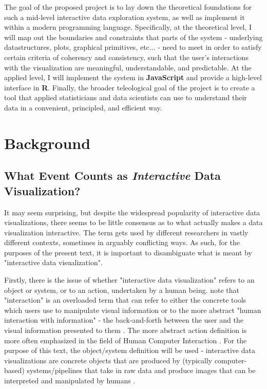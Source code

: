 \documentclass[12pt,a4paper]{article}
\begin{document}
The goal of the proposed project is to lay down the theoretical foundations for such a mid-level interactive data exploration system, as well as implement it within a modern programming language. Specifically, at the theoretical level, I will map out the boundaries and constraints that parts of the system - underlying datastructures, plots, graphical primitives, etc... - need to meet in order to satisfy certain criteria of coherency and consistency, such that the user's interactions with the visualization are meaningful, understandable, and predictable. At the applied level, I will implement the system in \textbf{JavaScript} and provide a high-level interface in \textbf{R}. Finally, the broader teleological goal of the project is to create a tool that applied statisticians and data scientists can use to understand their data in a convenient, principled, and efficient way. 

\section{Background}
\label{sec:background}

\subsection{What Event Counts as \textit{Interactive} Data Visualization?}

It may seem surprising, but despite the widespread popularity of interactive data visualizations, there seems to be little consensus as to what actually makes a data visualization interactive. The term gets used by different researchers in vastly different contexts, sometimes in arguably conflicting ways. As such, for the purposes of the present text, it is important to disambiguate what is meant by "interactive data visualization".  

Firstly, there is the issue of whether "interactive data visualization" refers to an object or system, or to an action, undertaken by a human being. \cite{pike2009} note that 
"interaction" is an overloaded term that can refer to either the concrete tools which users use to manipulate visual information or to the more abstract "human interaction with information" - the back-and-forth between the user and the visual information presented to them \citep[see also][]{yi2007}. The more abstract action definition is more often emphasized in the field of Human Computer Interaction \citep[see e.g.][]{sinha2010}. For the purpose of this text, the object/system definition will be used - interactive data visualizations are concrete objects that are produced by (typically computer-based) systems/pipelines that take in raw data and produce images that can be interpreted and manipulated by humans \citep{brodbeck2009}.
\end{document}
